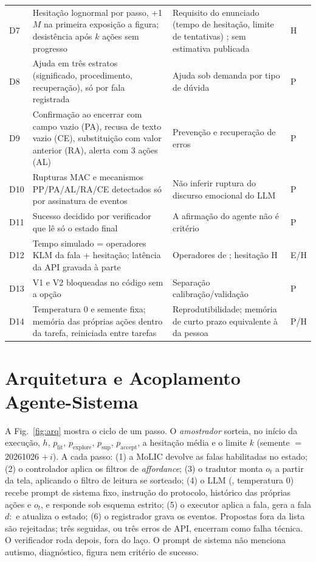 \begin{table}[t]
\begin{tabularx}{\textwidth}{@{}P{0.5cm}P{5.3cm}LP{0.4cm}@{}}
D7 & Hesitação lognormal por passo, +1 $M$ na primeira exposição a figura; desistência após $k$ ações sem progresso & Requisito do enunciado (tempo de hesitação, limite de tentativas) \cite{laviola2017}; sem estimativa publicada & H\\
D8 & Ajuda em três estratos (significado, procedimento, recuperação), só por fala registrada & Ajuda sob demanda por tipo de dúvida \cite{shneiderman2010} & P\\
D9 & Confirmação ao encerrar com campo vazio (PA), recusa de texto vazio (CE), substituição com valor anterior (RA), alerta com 3 ações (AL) & Prevenção e recuperação de erros \cite{shneiderman2010,reason1990} & P\\
D10 & Rupturas MAC e mecanismos PP/PA/AL/RA/CE detectados só por assinatura de eventos & Não inferir ruptura do discurso emocional do LLM \cite{lara2026p3,desouza2009,nielsen2010} & P\\
D11 & Sucesso decidido por verificador que lê só o estado final & A afirmação do agente não é critério \cite{lara2026p3} & P\\
D12 & Tempo simulado = operadores KLM da fala + hesitação; latência da API gravada à parte & Operadores de \cite{card1980}; hesitação H & E/H\\
D13 & V1 e V2 bloqueadas no código sem a opção  & Separação calibração/validação & P\\
D14 & Temperatura 0 e semente fixa; memória das próprias ações dentro da tarefa, reiniciada entre tarefas & Reprodutibilidade; memória de curto prazo equivalente à da pessoa & P/H\\
\bottomrule
\end{tabularx}
\end{table}

\section{Arquitetura e Acoplamento Agente-Sistema}
A Fig.~\ref{fig:arq} mostra o ciclo de um passo. O \emph{amostrador} sorteia, no início da execução, $h$, $p_{\text{lit}}$, $p_{\text{explore}}$, $p_{\text{sup}}$, $p_{\text{accept}}$, a hesitação média e o limite $k$ (semente $=$ 20261026 $+\,i$). A cada passo: (1) a MoLIC devolve as falas habilitadas no estado; (2) o controlador aplica os filtros de \emph{affordance}; (3) o tradutor monta $o_t$ a partir da tela, aplicando o filtro de leitura se sorteado; (4) o LLM (, temperatura 0) recebe prompt de sistema fixo, instrução do protocolo, histórico das próprias ações e $o_t$, e responde  sob esquema estrito; (5) o executor aplica a fala, gera a fala $d{:}$ e atualiza o estado; (6) o registrador grava os eventos. Propostas fora da lista são rejeitadas; três seguidas, ou três erros de API, encerram como falha técnica. O verificador roda depois, fora do laço. O prompt de sistema não menciona autismo, diagnóstico, figura nem critério de sucesso.


